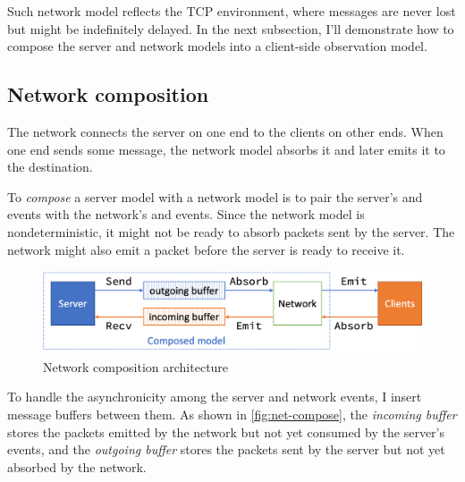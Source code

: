 Such network model reflects the TCP environment, where messages are never lost
but might be indefinitely delayed.  In the next subsection, I'll demonstrate how
to compose the server and network models into a client-side observation model.

\subsection{Network composition}
\label{sec:net-compose}

The network connects the server on one end to the clients on other ends.  When
one end sends some message, the network model absorbs it and later emits it to
the destination.

To {\em compose} a server model with a network model is to pair the server's
 and  events with the network's  and 
events.  Since the network model is nondeterministic, it might not be ready to
absorb packets sent by the server.  The network might also emit a packet before
the server is ready to receive it.

\begin{figure}
  \includegraphics[width=\textwidth]{figures/net-compose}
  \caption{Network composition architecture}
  \label{fig:net-compose}
\end{figure}

To handle the asynchronicity among the server and network events, I insert
message buffers between them.  As shown in \autoref{fig:net-compose}, the {\em
  incoming buffer} stores the packets emitted by the network but not yet
consumed by the server's  events, and the {\em outgoing buffer} stores
the packets sent by the server but not yet absorbed by the network.

